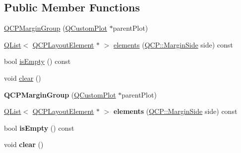 \subsection*{Public Member Functions}
\begin{DoxyCompactItemize}
\item 
\hyperlink{class_q_c_p_margin_group_ac481c20678ec5b305d6df330715f4b7b}{Q\+C\+P\+Margin\+Group} (\hyperlink{class_q_custom_plot}{Q\+Custom\+Plot} $\ast$parent\+Plot)
\item 
\hyperlink{class_q_list}{Q\+List}$<$ \hyperlink{class_q_c_p_layout_element}{Q\+C\+P\+Layout\+Element} $\ast$ $>$ \hyperlink{class_q_c_p_margin_group_a2f39e319c9ece34e0392c2ca350f1069}{elements} (\hyperlink{namespace_q_c_p_a7e487e3e2ccb62ab7771065bab7cae54}{Q\+C\+P\+::\+Margin\+Side} side) const 
\item 
bool \hyperlink{class_q_c_p_margin_group_a28c8e87a0b87c01bd28c693faabddd7b}{is\+Empty} () const 
\item 
void \hyperlink{class_q_c_p_margin_group_a144b67f216e4e86c3a3a309e850285fe}{clear} ()
\item 
{\bfseries Q\+C\+P\+Margin\+Group} (\hyperlink{class_q_custom_plot}{Q\+Custom\+Plot} $\ast$parent\+Plot)\hypertarget{class_q_c_p_margin_group_ac481c20678ec5b305d6df330715f4b7b}{}\label{class_q_c_p_margin_group_ac481c20678ec5b305d6df330715f4b7b}

\item 
\hyperlink{class_q_list}{Q\+List}$<$ \hyperlink{class_q_c_p_layout_element}{Q\+C\+P\+Layout\+Element} $\ast$ $>$ {\bfseries elements} (\hyperlink{namespace_q_c_p_a7e487e3e2ccb62ab7771065bab7cae54}{Q\+C\+P\+::\+Margin\+Side} side) const \hypertarget{class_q_c_p_margin_group_aed243cf856392c55b57e7ce778c0a040}{}\label{class_q_c_p_margin_group_aed243cf856392c55b57e7ce778c0a040}

\item 
bool {\bfseries is\+Empty} () const \hypertarget{class_q_c_p_margin_group_a28c8e87a0b87c01bd28c693faabddd7b}{}\label{class_q_c_p_margin_group_a28c8e87a0b87c01bd28c693faabddd7b}

\item 
void {\bfseries clear} ()\hypertarget{class_q_c_p_margin_group_a144b67f216e4e86c3a3a309e850285fe}{}\label{class_q_c_p_margin_group_a144b67f216e4e86c3a3a309e850285fe}

\end{DoxyCompactItemize}

